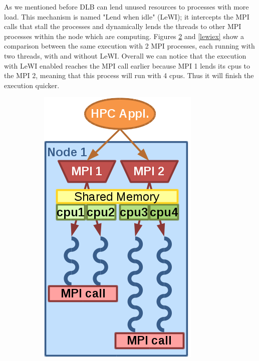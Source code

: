 As we mentioned before DLB can lend unused resources to processes with more load. This mechanism is named "Lend when idle" (LeWI); it intercepts the MPI calls that stall the processes and dynamically lends the threads to other MPI processes within the node which are computing. Figures \ref{nolewiex} and \ref{lewiex} show a comparison between the same execution with 2 MPI processes, each running with two threads, with and without LeWI. Overall we can notice that the execution with LeWI enabled reaches the MPI call earlier because MPI 1 lends its cpus to the MPI 2, meaning that this process will run with 4 cpus. Thus it will finish the execution quicker.
\begin{figure}[h]
  \centering
  \begin{subfigure}{0.4\textwidth}
    \includegraphics[width=0.8\linewidth]{graphics/dlb_example_nolewi.png}
    \label{nolewiex}

\end{subfigure}
\end{figure}
